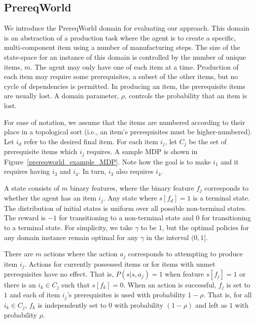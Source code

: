 \documentclass[letterpaper]{article} %
\begin{document}
\subsection{PrereqWorld} \label{em_prereqworld}

We introduce the PrereqWorld domain for evaluating our approach.
This domain is an abstraction of a production task where the agent is to create a specific, multi-component item using a number of manufacturing steps.
The size of the state-space for an instance of this domain is controlled by the number of unique items, $m$.
The agent may only have one of each item at a time.
Production of each item may require some prerequisites, a subset of the other items, but no cycle of dependencies is permitted.
In producing an item, the prerequisite items are usually lost.
A domain parameter, $\rho$, controls the probability that an item is lost.

For ease of notation, we assume that the items are numbered according to their place in a topological sort (i.e., an item's prerequisites must be higher-numbered).
Let $i_d$ refer to the desired final item.
For each item $i_j$, let $C_j$ be the set of prerequisite items which $i_j$ requires.
A sample MDP is shown in Figure~\ref{prereqworld_example_MDP}.
Note how the goal is to make $i_1$ and it requires having $i_3$ and $i_4$. In turn, $i_3$ also requires $i_4$.

A state consists of $m$ binary features, where the binary feature $f_j$ corresponds to whether the agent has an item $i_j$.
Any state where $s[f_d]=1$ is a terminal state.
The distribution of initial states is uniform over all possible non-terminal states.
The reward is $-1$ for transitioning to a non-terminal state and $0$ for transitioning to a terminal state.
For simplicity, we take $\gamma$ to be $1$, but the optimal policies for any domain instance remain optimal for any $\gamma$ in the interval $(0,1]$.

There are $m$ actions where the action $a_j$ corresponds to attempting to produce item $i_j$.
Actions for currently possessed items or for items with unmet prerequisites have no effect.
That is, $P(s | s, a_j) = 1$ when feature $s[f_j] = 1$ or there is an $i_k \in C_j$ such that $s[f_k] = 0$.
When an action is successful, $f_j$ is set to $1$ and each of item $i_j$'s prerequisites is used with probability $1-\rho$. That is, for all $i_k \in C_j$, $f_k$ is independently set to $0$ with probability $(1-\rho)$ and left as $1$ with probability $\rho$.

\end{document}
